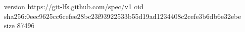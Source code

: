 version https://git-lfs.github.com/spec/v1
oid sha256:0eec9625cc6cefee28bc23f93922533b55d19ad1234408c2cefe3b6db6e32ebe
size 87496
